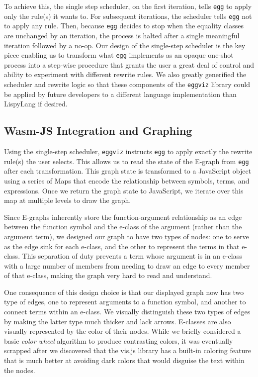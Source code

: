 \documentclass[letterpaper,twocolumn,11pt]{article}
\begin{document}
To achieve this, the single step scheduler, on the first iteration, tells
\texttt{egg} to apply only the rule(s) it wants to. For subsequent iterations,
the scheduler tells \texttt{egg} not to apply any rule. Then, because
\texttt{egg} decides to stop when the equality classes are unchanged by an
iteration, the process is halted after a single meaningful iteration followed by
a no-op. Our design of the single-step scheduler is the key piece enabling us to
transform what \texttt{egg} implements as an opaque one-shot process into a
step-wise procedure that grants the user a great deal of control and ability to
experiment with different rewrite rules. We also greatly generified the
scheduler and rewrite logic so that these components of the \texttt{eggviz}
library could be applied by future developers to a different language
implementation than LispyLang if desired.

\subsection{Wasm-JS Integration and Graphing}
Using the single-step scheduler, \texttt{eggviz} instructs \texttt{egg} to apply
exactly the rewrite rule(s) the user selects. This allows us to read the state
of the E-graph from \texttt{egg} after each transformation. This graph state is
transformed to a JavaScript object using a series of Maps that encode the
relationship between symbols, terms, and expressions.  Once we return the graph
state to JavaScript, we iterate over this map at multiple levels to draw the
graph.

Since E-graphs inherently store the function-argument relationship as an edge
between the function symbol and the e-class of the argument (rather than the
argument term), we designed our graph to have two types of nodes: one to serve
as the edge sink for each e-class, and the other to represent the terms in that
e-class. This separation of duty prevents a term whose argument is in an e-class
with a large number of members from needing to draw an edge to every member of
that e-class, making the graph very hard to read and understand.

One consequence of this design choice is that our displayed graph now has two
type of edges, one to represent arguments to a function symbol, and another to
connect terms within an e-class. We visually distinguish these two types of
edges by making the latter type much thicker and lack arrows. E-classes are also
visually represented by the color of their nodes. While we briefly considered a
basic \textit{color wheel} algorithm to produce contrasting colors, it was
eventually scrapped after we discovered that the vis.js library has a built-in
coloring feature that is much better at avoiding dark colors that would disguise
the text within the nodes.
\end{document}
